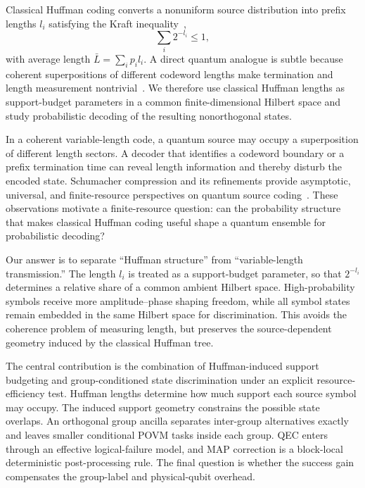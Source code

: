 \documentclass[
 reprint,
 amsmath,amssymb,
 aps,
 pra,
 floatfix,
]{revtex4-2}
\begin{document}
Classical Huffman coding converts a nonuniform source distribution into prefix lengths $l_i$ satisfying the Kraft inequality~\cite{shannon1948mathematical,huffman1952method,cover2006elements},
\begin{equation}
    \sum_i2^{-l_i}\le 1,
    \label{eq:kraft_intro}
\end{equation}
with average length $\bar L=\sum_i p_i l_i$. A direct quantum analogue is subtle because coherent superpositions of different codeword lengths make termination and length measurement nontrivial~\cite{schumacher1995quantum,jozsa1994new,jozsa1998optimal,braunstein2000quantum,schumacher2001indeterminate,bostrom2002lossless,hayashi2002quantum,hayashi2002simple,muller2009variable}. We therefore use classical Huffman lengths as support-budget parameters in a common finite-dimensional Hilbert space and study probabilistic decoding of the resulting nonorthogonal states.

In a coherent variable-length code, a quantum source may occupy a superposition of different length sectors. A decoder that identifies a codeword boundary or a prefix termination time can reveal length information and thereby disturb the encoded state. Schumacher compression and its refinements provide asymptotic, universal, and finite-resource perspectives on quantum source coding~\cite{schumacher1995quantum,jozsa1994new,wilde2013quantum,tomamichel2013hierarchy,tomamichel2016finite}. These observations motivate a finite-resource question: can the probability structure that makes classical Huffman coding useful shape a quantum ensemble for probabilistic decoding?

Our answer is to separate ``Huffman structure'' from ``variable-length transmission.'' The length $l_i$ is treated as a support-budget parameter, so that $2^{-l_i}$ determines a relative share of a common ambient Hilbert space. High-probability symbols receive more amplitude--phase shaping freedom, while all symbol states remain embedded in the same Hilbert space for discrimination. This avoids the coherence problem of measuring length, but preserves the source-dependent geometry induced by the classical Huffman tree.

The central contribution is the combination of Huffman-induced support budgeting and group-conditioned state discrimination under an explicit resource-efficiency test. Huffman lengths determine how much support each source symbol may occupy. The induced support geometry constrains the possible state overlaps. An orthogonal group ancilla separates inter-group alternatives exactly and leaves smaller conditional POVM tasks inside each group. QEC enters through an effective logical-failure model, and MAP correction is a block-local deterministic post-processing rule. The final question is whether the success gain compensates the group-label and physical-qubit overhead.
\end{document}
